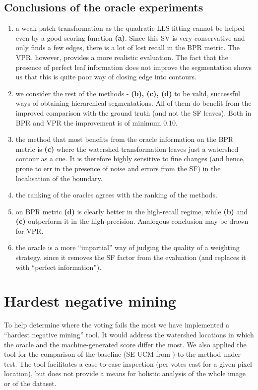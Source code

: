 \subsection{Conclusions of the oracle experiments}
\begin{enumerate}
 \item a weak patch transformation as the quadratic LLS fitting cannot be helped even by a good scoring function {\bf (a)}. Since this SV is very conservative and only finds a few edges, there is a lot of lost recall in the BPR metric. The VPR, however, provides a more realistic evaluation. The fact that the presence of perfect leaf information does not improve the segmentation shows us that this is quite poor way of closing edge into contours.
 \item we consider the rest of the methods - {\bf (b), (c), (d)} to be valid, successful ways of obtaining hierarchical segmentations. All of them do benefit from the improved comparison with the ground truth (and not the SF leaves). Both in BPR and VPR the improvement is of minimum 0.10.
 \item the method that most benefits from the oracle information on the BPR metric is {\bf (c)} where the watershed transformation leaves just a watershed contour as a cue. It is therefore highly %
 sensitive to fine changes (and hence, prone to err in the presence of noise and errors from the SF) in the localisation of the boundary.
 \item the ranking of the oracles agrees with the ranking of the methods.
 \item on BPR metric {\bf (d)} is clearly better in the high-recall regime, while {\bf (b)} and {\bf (c)} outperform it in the high-precision. Analogous conclusion may be drawn for VPR.
 \item the oracle is a more ``impartial'' way of judging the quality of a weighting strategy, since it removes the SF factor from the evaluation (and replaces it with ``perfect information'').
\end{enumerate}

\section{Hardest negative mining}
To help determine where the voting fails the most we have implemented a ``hardest negative mining'' tool. It would address the watershed locations in which the oracle and the machine-generated score differ the most. We also applied the tool for the comparison of the baseline (SE-UCM from ) to the method under test. The tool facilitates a case-to-case inspection (per votes cast for a given pixel location), but does not provide a means for holistic analysis of the whole image or of the dataset.

